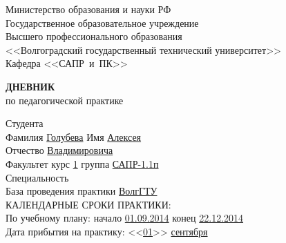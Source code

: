 \documentclass[a4paper, 14pt]{extreport}
\begin{document}
    \begin{titlepage}
        \begin{center}
            Министерство образования и науки РФ \\
            Государственное образовательное учреждение\\
            Высшего профессионального образования\\
            <<Волгоградский государственный технический университет>>\\
            Кафедра <<САПР~и~ПК>>
        \end{center}
        \vspace{2cm}
        \begin{center}
            \large \textbf{ДНЕВНИК} \\
            по педагогической практике
        \end{center}
        \begin{flushleft}
            Студента\\
            Фамилия \underline{Голубева\hspace{3.1cm}} 
            Имя \underline{Алексея\hspace{2.1cm}}\\
            Отчество \underline{Владимировича\hspace{1.6cm}}\\
            Факультет \underline{\hspace{4.8cm}} курс \underline{1\hspace{1.5cm}} 
            группа \underline{САПР-1.1п\hspace{1.9cm}}\\
            \vspace{1cm}
            Специальность \underline{\hspace{12.8cm}}\\
            База проведения практики \underline{ВолгГТУ\hspace{8.4cm}}\\
            \vspace{1cm}
            КАЛЕНДАРНЫЕ СРОКИ ПРАКТИКИ:\\
            По учебному плану: \hspace{0.2cm} начало \underline{01.09.2014\hspace{1.8cm}} 
            конец \underline{22.12.2014\hspace{1.8cm}}\\
            Дата прибытия на практику: <<\underline{01}>> \underline{сентября\hspace{1.2cm}} 

\end{flushleft}
\end{titlepage}
\end{document}
